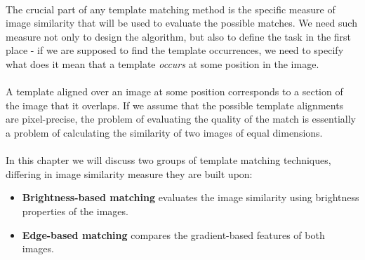 \paragraph*{}
The crucial part of any template matching method is the specific measure of image similarity that will be used to evaluate the possible matches. We need such measure not only to design the algorithm, but also to define the task in the first place - if we are supposed to find the template occurrences, we need to specify what does it mean that a template \textit{occurs} at some position in the image. 

\paragraph*{}
A template aligned over an image at some position corresponds to a section of the image that it overlaps. If we assume that the possible template alignments are pixel-precise, the problem of evaluating the quality of the match is essentially a problem of calculating the similarity of two images of equal dimensions.

\paragraph*{}
In this chapter we will discuss two groups of template matching techniques, differing in image similarity measure they are built upon:

\begin{itemize}
	\item \textbf{Brightness-based matching} evaluates the image similarity using brightness properties of the images.
	\item \textbf{Edge-based matching} compares the gradient-based features of both images.
\end{itemize}
